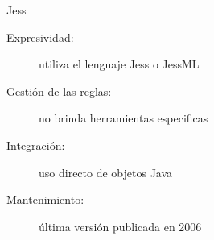 \documentclass[10pt]{beamer}
\begin{document}
\begin{frame}{Jess}
    \begin{description}
        \item [Expresividad:] utiliza el lenguaje Jess o JessML
        \item [Gestión de las reglas:] no brinda herramientas especificas
        \item [Integración:] uso directo de objetos Java
        \item [Mantenimiento:] última versión publicada en 2006
    \end{description}
\end{frame}

\end{document}
